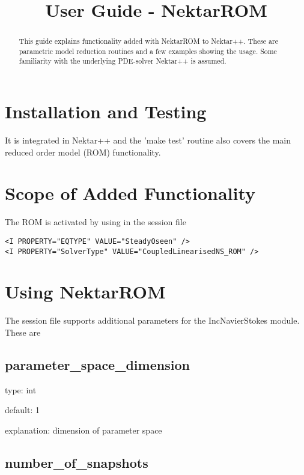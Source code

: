 \documentclass[a4paper,10pt]{article}
\title{User Guide - NektarROM}
\author{}
\begin{document}
\maketitle

\begin{abstract}
This guide explains functionality added with NektarROM to Nektar++. These are 
parametric model reduction routines and a few examples showing the usage.
Some familiarity with the underlying PDE-solver Nektar++ is assumed. 
\end{abstract}

\section{Installation and Testing}

It is integrated in Nektar++ and the 'make test' routine also covers the main
reduced order model (ROM) functionality.

\section{Scope of Added Functionality}

The ROM is activated by using in the session file

\begin{verbatim}
<I PROPERTY="EQTYPE" VALUE="SteadyOseen" />
<I PROPERTY="SolverType" VALUE="CoupledLinearisedNS_ROM" />
\end{verbatim}

\section{Using NektarROM}

The session file supports additional parameters for the IncNavierStokes module.
These are

\subsection{parameter\_space\_dimension}

\noindent type: int

\noindent default: 1

\noindent explanation: dimension of parameter space

\subsection{number\_of\_snapshots}
\end{document}
